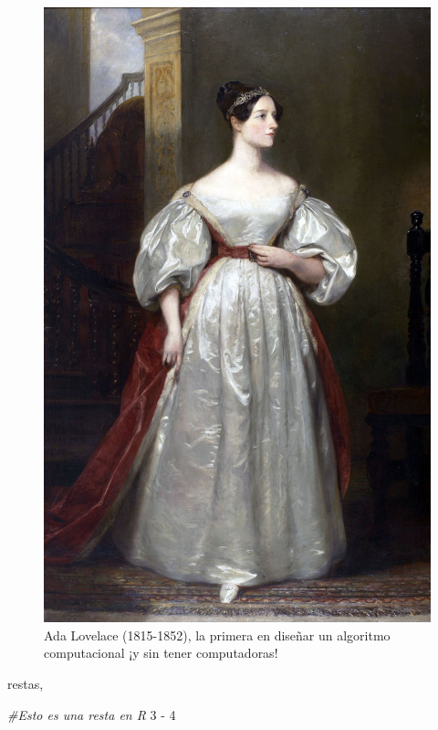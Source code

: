 \documentclass[
]{book}
\newenvironment{Shaded}{\begin{snugshade}}{\end{snugshade}}
\newcommand{\CommentTok}[1]{\textcolor[rgb]{0.56,0.35,0.01}{\textit{#1}}}
\newcommand{\DecValTok}[1]{\textcolor[rgb]{0.00,0.00,0.81}{#1}}
\newcommand{\SpecialCharTok}[1]{\textcolor[rgb]{0.00,0.00,0.00}{#1}}
\begin{document}
\begin{figure}

{\centering \includegraphics[width=14.22in]{images/ada_lovelace} 

}

\caption{Ada Lovelace (1815-1852), la primera en diseñar un algoritmo computacional ¡y sin tener computadoras!}\label{fig:unnamed-chunk-230}
\end{figure}

restas,

\begin{Shaded}
\begin{Highlighting}[]
\CommentTok{\#Esto es una resta en R}
\DecValTok{3} \SpecialCharTok{{-}} \DecValTok{4}
\end{Highlighting}
\end{Shaded}
\end{document}
